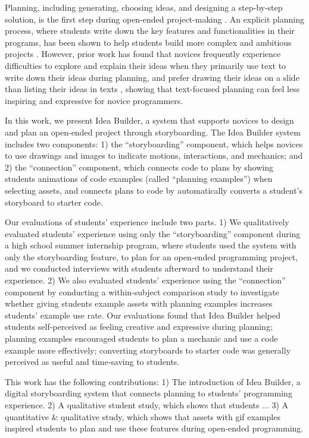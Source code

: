 Planning, including generating, choosing ideas, and designing a step-by-step solution, is the first step during open-ended project-making \cite{saad2022review}. An explicit planning process, where students write down the key features and functionalities in their programs, has been shown to help students build more complex and ambitious projects \cite{gonzalez2022investigating}. However, prior work has found that novices frequently experience difficulties to explore and explain their ideas when they primarily use text to write down their ideas during planning, and prefer drawing their ideas on a slide than listing their ideas in texts \cite{limke2022case}, showing that text-focused planning can feel less inspiring and expressive for novice programmers. 

In this work, we present Idea Builder, a system that supports novices to design and plan an open-ended project through storyboarding. The Idea Builder system includes two components: 1) the ``storyboarding'' component, which helps novices to use drawings and images to indicate motions, interactions, and mechanics; and 2) the ``connection'' component, which connects code to plans by showing students animations of code examples (called ``planning examples'') when selecting assets, and connects plans to code by automatically converts a student's storyboard to starter code. 

Our evaluations of students' experience include two parts. 1) We qualitatively evaluated students' experience using only the ``storyboarding'' component during a high school summer internship program, where students used the system with only the storyboarding feature, to plan for an open-ended programming project, and we conducted interviews with students afterward to understand their experience. 2) We also evaluated students' experience using the ``connection'' component by conducting a within-subject comparison study to investigate whether giving students example assets with planning examples increases students' example use rate. Our evaluations found that Idea Builder helped students self-perceived as feeling creative and expressive during planning; planning examples encouraged students to plan a mechanic and use a code example more effectively; converting storyboards to starter code was generally perceived as useful and time-saving to students.

This work has the following contributions:
1) The introduction of Idea Builder, a digital storyboarding system that connects planning to students' \snap programming experience. 
2) A qualitative student study, which shows that students ... %
3) A quantitative \& qualitative study, which shows that assets with gif examples inspired students to plan and use these features during open-ended programming. 









